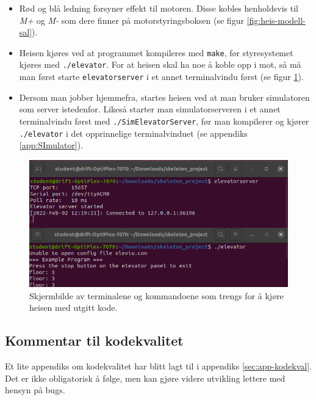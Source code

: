 \begin{alphasection}
\begin{itemize}
    \item Rød og blå ledning forsyner effekt til motoren. Disse kobles henholdsvis til \textit{M+} og \textit{M-} som dere finner på motorstyringsboksen (se figur \ref{fig:heis-modell-sal}).
    \item Heisen kjøres ved at programmet kompileres med \verb|make|, før styresystemet kjøres med \verb|./elevator|. For at heisen skal ha noe å koble opp i mot, så må man først starte  \verb|elevatorserver|  i et annet terminalvindu først (se figur \ref{fig:terminal-oppstart-heis}).
    \item Dersom man jobber hjemmefra, startes heisen ved at man bruker simulatoren som server istedenfor. Likeså starter man simulatorserveren i et annet terminalvindu først med \verb|./SimElevatorServer|, før man kompilerer og kjører \verb|./elevator| i det opprinnelige terminalvinduet (se appendiks \ref{app:SImulator}).
\end{itemize}

\begin{figure}[ht]
    \centering
    \includegraphics[scale=0.65]{Main/figures/terminal-heis.png}
    \caption{Skjermbilde av terminalene og kommandoene som trengs for å kjøre heisen med utgitt kode.}
    \label{fig:terminal-oppstart-heis}
\end{figure}


\subsection{Kommentar til kodekvalitet}
Et lite appendiks om kodekvalitet har blitt lagt til i appendiks \ref{sec:app-kodekval}. Det er ikke obligatorisk å følge, men kan gjøre videre utvikling lettere med hensyn på bugs.

\end{alphasection}
\clearpage


\setcounter{section}{0}

